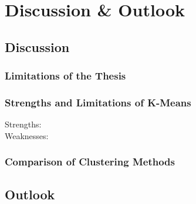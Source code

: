\chapter{Discussion \& Outlook}
\label{cha:discussion}




\section{Discussion}
\subsection{Limitations of the Thesis}
\subsection{Strengths and Limitations of K-Means}
\begin{description}
    \item[Strengths:]
    \item[Weaknesses:]  
\end{description}
\subsection{Comparison of Clustering Methods}

\section{Outlook}